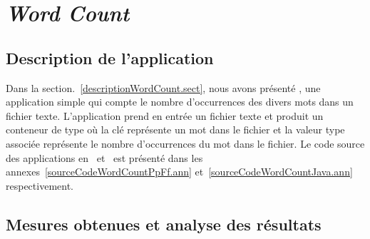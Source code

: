 

\section{\emph{Word Count}}
\label{wordcount.sect}






\subsection{Description de l'application }



Dans la section.~\ref{descriptionWordCount.sect}, nous avons pr\'esent\'e , une application simple qui compte le nombre d'occurrences des divers mots dans un fichier texte. L'application prend en entr\'ee un fichier texte et produit un conteneur de type  où la cl\'e repr\'esente un mot dans le fichier et la valeur  type   associ\'ee repr\'esente le nombre d'occurrences du mot dans le fichier. Le code source des applications  en~ et~ est pr\'esent\'e dans les annexes~\ref{sourceCodeWordCountPpFf.ann} et~\ref{sourceCodeWordCountJava.ann} respectivement.


\subsection{Mesures obtenues et analyse des r\'esultats}




